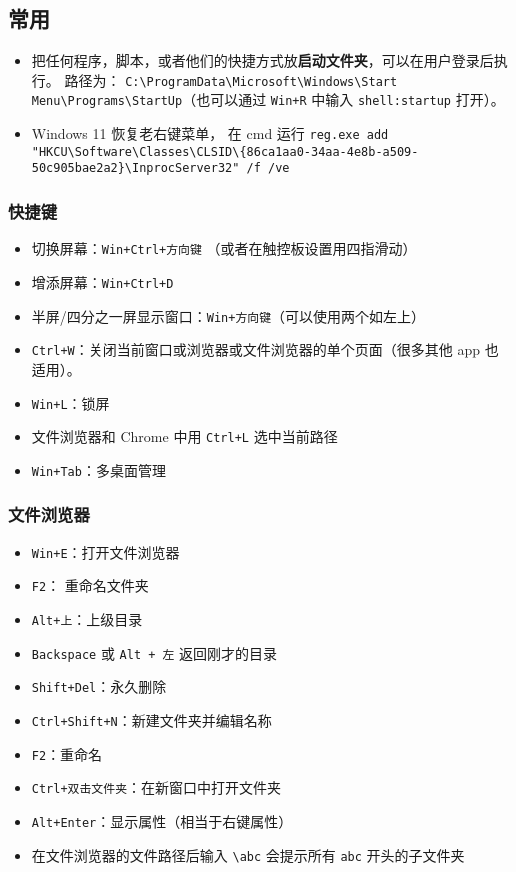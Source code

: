
\subsection{常用}
\begin{itemize}
\item 把任何程序，脚本，或者他们的快捷方式放\textbf{启动文件夹}，可以在用户登录后执行。 路径为： \verb|C:\ProgramData\Microsoft\Windows\Start Menu\Programs\StartUp|（也可以通过 \verb|Win+R| 中输入 \verb|shell:startup| 打开）。
\item Windows 11 恢复老右键菜单， 在 cmd 运行 \verb`reg.exe add "HKCU\Software\Classes\CLSID\{86ca1aa0-34aa-4e8b-a509-50c905bae2a2}\InprocServer32" /f /ve`
\end{itemize}

\subsubsection{快捷键}
\begin{itemize}
\item 切换屏幕：\verb|Win+Ctrl+方向键| （或者在触控板设置用四指滑动）
\item 增添屏幕：\verb|Win+Ctrl+D|
\item 半屏/四分之一屏显示窗口：\verb|Win+方向键|（可以使用两个如左上）
\item \verb|Ctrl+W|：关闭当前窗口或浏览器或文件浏览器的单个页面（很多其他 app 也适用）。
\item \verb|Win+L|：锁屏
\item 文件浏览器和 Chrome 中用 \verb|Ctrl+L| 选中当前路径
\item \verb|Win+Tab|：多桌面管理
\end{itemize}

\subsubsection{文件浏览器}
\begin{itemize}
\item \verb|Win+E|：打开文件浏览器
\item \verb`F2`： 重命名文件夹
\item \verb|Alt+上|：上级目录
\item \verb|Backspace| 或 \verb|Alt + 左| 返回刚才的目录
\item \verb|Shift+Del|：永久删除
\item \verb|Ctrl+Shift+N|：新建文件夹并编辑名称
\item \verb|F2|：重命名
\item \verb|Ctrl+双击文件夹|：在新窗口中打开文件夹
\item \verb`Alt+Enter`：显示属性（相当于右键属性）
\item 在文件浏览器的文件路径后输入 \verb`\abc` 会提示所有 \verb`abc` 开头的子文件夹
\end{itemize}

